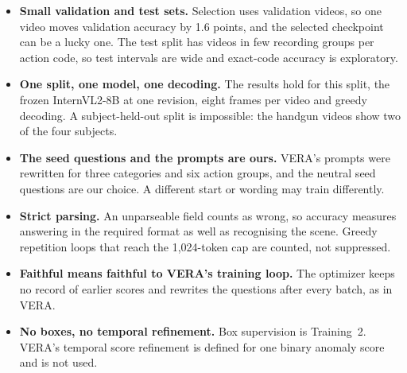\begin{itemize}
\item \textbf{Small validation and test sets.} Selection uses  validation videos, so one video moves validation accuracy by 1.6 points, and the selected checkpoint can be a lucky one. The test split has  videos in few recording groups per action code, so test intervals are wide and exact-code accuracy is exploratory.
\item \textbf{One split, one model, one decoding.} The results hold for this split, the frozen InternVL2-8B at one revision, eight frames per video and greedy decoding. A subject-held-out split is impossible: the handgun videos show two of the four subjects.
\item \textbf{The seed questions and the prompts are ours.} VERA's prompts were rewritten for three categories and six action groups, and the neutral seed questions are our choice. A different start or wording may train differently.
\item \textbf{Strict parsing.} An unparseable field counts as wrong, so accuracy measures answering in the required format as well as recognising the scene. Greedy repetition loops that reach the 1,024-token cap are counted, not suppressed.
\item \textbf{Faithful means faithful to VERA's training loop.} The optimizer keeps no record of earlier scores and rewrites the questions after every batch, as in VERA.
\item \textbf{No boxes, no temporal refinement.} Box supervision is Training~2. VERA's temporal score refinement is defined for one binary anomaly score and is not used.
\end{itemize}
